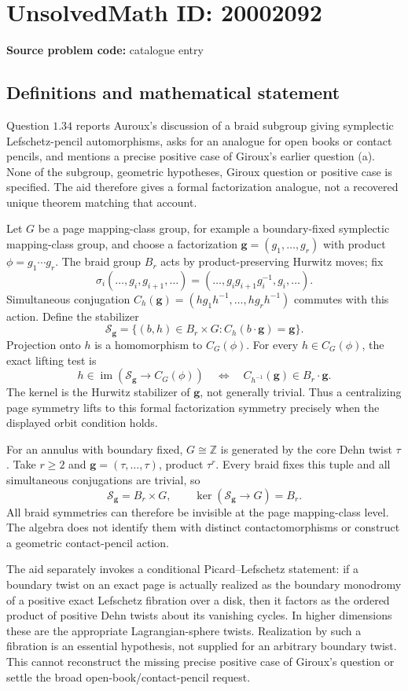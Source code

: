 \documentclass[11pt]{article}
\newcommand{\Z}{\mathbb{Z}}
\begin{document}
\section*{UnsolvedMath ID: 20002092}
\textbf{Source problem code:} catalogue entry
\subsection{Definitions and mathematical statement}
Question \(1.34\) reports Auroux's discussion of a braid subgroup giving symplectic Lefschetz-pencil automorphisms, asks for an analogue for open books or contact pencils, and mentions a precise positive case of Giroux's earlier question (a). None of the subgroup, geometric hypotheses, Giroux question or positive case is specified. The aid therefore gives a formal factorization analogue, not a recovered unique theorem matching that account.

Let \(G\) be a page mapping-class group, for example a boundary-fixed symplectic mapping-class group, and choose a factorization \(\mathbf g=(g_1,\ldots,g_r)\) with product \(\phi=g_1\cdots g_r\). The braid group \(B_r\) acts by product-preserving Hurwitz moves; fix
\[
 \sigma_i(\ldots,g_i,g_{i+1},\ldots)
 =(\ldots,g_ig_{i+1}g_i^{-1},g_i,\ldots).
\]
Simultaneous conjugation \(C_h(\mathbf g)=(hg_1h^{-1},\ldots,hg_rh^{-1})\) commutes with this action. Define the stabilizer
\[
 \mathcal S_{\mathbf g}
 =\{(b,h)\in B_r\times G:C_h(b\cdot\mathbf g)=\mathbf g\}.
\]
Projection onto \(h\) is a homomorphism to \(C_G(\phi)\). For every \(h\in C_G(\phi)\), the exact lifting test is
\[
 h\in\operatorname{im}(\mathcal S_{\mathbf g}\to C_G(\phi))
 \quad\Longleftrightarrow\quad
 C_{h^{-1}}(\mathbf g)\in B_r\cdot\mathbf g.
\]
The kernel is the Hurwitz stabilizer of \(\mathbf g\), not generally trivial. Thus a centralizing page symmetry lifts to this formal factorization symmetry precisely when the displayed orbit condition holds.

For an annulus with boundary fixed, \(G\cong\Z\) is generated by the core Dehn twist \(\tau\). Take \(r\geq2\) and \(\mathbf g=(\tau,\ldots,\tau)\), product \(\tau^r\). Every braid fixes this tuple and all simultaneous conjugations are trivial, so
\[
 \mathcal S_{\mathbf g}=B_r\times G,
 \qquad\ker(\mathcal S_{\mathbf g}\to G)=B_r.
\]
All braid symmetries can therefore be invisible at the page mapping-class level. The algebra does not identify them with distinct contactomorphisms or construct a geometric contact-pencil action.

The aid separately invokes a conditional Picard--Lefschetz statement: if a boundary twist on an exact page is actually realized as the boundary monodromy of a positive exact Lefschetz fibration over a disk, then it factors as the ordered product of positive Dehn twists about its vanishing cycles. In higher dimensions these are the appropriate Lagrangian-sphere twists. Realization by such a fibration is an essential hypothesis, not supplied for an arbitrary boundary twist. This cannot reconstruct the missing precise positive case of Giroux's question or settle the broad open-book/contact-pencil request.
\end{document}

